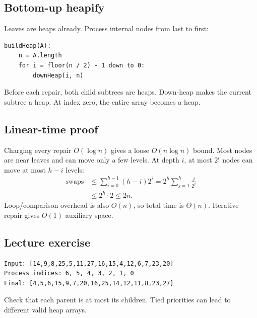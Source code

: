 \documentclass[11pt,letterpaper]{article}
\begin{document}
\subsection{Bottom-up heapify}
Leaves are heaps already. Process internal nodes from last to first:
\par\noindent\begin{minipage}{\linewidth}
\begin{lstlisting}
buildHeap(A):
    n = A.length
    for i = floor(n / 2) - 1 down to 0:
        downHeap(i, n)
\end{lstlisting}
\end{minipage}\par
Before each repair, both child subtrees are heaps. Down-heap makes the current subtree a heap. At index zero, the entire array becomes a heap.

\subsection{Linear-time proof}
Charging every repair $O(\log n)$ gives a loose $O(n\log n)$ bound. Most nodes are near leaves and can move only a few levels. At depth $i$, at most $2^i$ nodes can move at most $h-i$ levels:
\begin{align*}
\text{swaps}&\leq\sum_{i=0}^{h-1}(h-i)2^i
=2^h\sum_{j=1}^h\frac{j}{2^j}\\
&\leq2^h\cdot2\leq2n.
\end{align*}
Loop/comparison overhead is also $O(n)$, so total time is $\Theta(n)$. Iterative repair gives $O(1)$ auxiliary space.

\subsection{Lecture exercise}
\par\noindent\begin{minipage}{\linewidth}
\begin{lstlisting}
Input: [14,9,8,25,5,11,27,16,15,4,12,6,7,23,20]
Process indices: 6, 5, 4, 3, 2, 1, 0
Final: [4,5,6,15,9,7,20,16,25,14,12,11,8,23,27]
\end{lstlisting}
\end{minipage}\par
Check that each parent is at most its children. Tied priorities can lead to different valid heap arrays.
\end{document}
